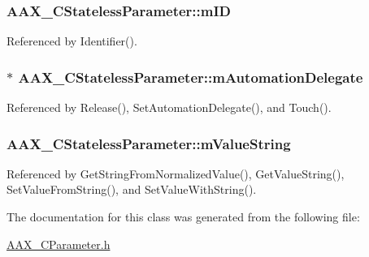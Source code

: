 \hypertarget{a00040_a9fe3a08c63ad9f1993bb0eeddb1a3bcc}{}
\subsubsection[{m\+I\+D}]{ A\+A\+X\+\_\+\+C\+Stateless\+Parameter\+::m\+I\+D\hspace{0.3cm}{\ttfamily [protected]}}\label{a00040_a9fe3a08c63ad9f1993bb0eeddb1a3bcc}


Referenced by Identifier().

\hypertarget{a00040_ae5a1336d5b23ab6d72756eb14d14a517}{}
\subsubsection[{m\+Automation\+Delegate}]{$\ast$ A\+A\+X\+\_\+\+C\+Stateless\+Parameter\+::m\+Automation\+Delegate\hspace{0.3cm}{\ttfamily [protected]}}\label{a00040_ae5a1336d5b23ab6d72756eb14d14a517}


Referenced by Release(), Set\+Automation\+Delegate(), and Touch().

\hypertarget{a00040_ad9d69aab224d8a96250611b0961c75d1}{}
\subsubsection[{m\+Value\+String}]{ A\+A\+X\+\_\+\+C\+Stateless\+Parameter\+::m\+Value\+String\hspace{0.3cm}{\ttfamily [protected]}}\label{a00040_ad9d69aab224d8a96250611b0961c75d1}


Referenced by Get\+String\+From\+Normalized\+Value(), Get\+Value\+String(), Set\+Value\+From\+String(), and Set\+Value\+With\+String().



The documentation for this class was generated from the following file\+:\begin{DoxyCompactItemize}
\item 
\hyperlink{a00190}{A\+A\+X\+\_\+\+C\+Parameter.\+h}\end{DoxyCompactItemize}
